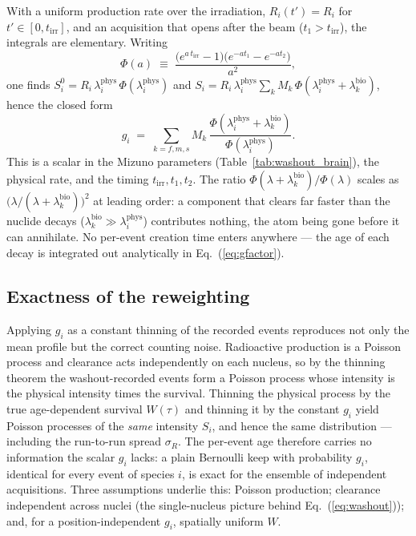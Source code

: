 \documentclass[11pt]{article}
\begin{document}
With a uniform production rate over the irradiation, $R_i(t')=R_i$ for
$t'\in[0,t_{\mathrm{irr}}]$, and an acquisition that opens after the beam
($t_1>t_{\mathrm{irr}}$), the integrals are elementary. Writing
%
\begin{equation}
  \Phi(a) \;\equiv\;
  \frac{\bigl(e^{a\,t_{\mathrm{irr}}}-1\bigr)
        \bigl(e^{-a t_1}-e^{-a t_2}\bigr)}{a^{2}},
  \label{eq:phifun}
\end{equation}
%
one finds $S_i^{0}=R_i\,\lambda_i^{\mathrm{phys}}\,\Phi(\lambda_i^{\mathrm{phys}})$
and $S_i=R_i\,\lambda_i^{\mathrm{phys}}\sum_k M_k\,
\Phi(\lambda_i^{\mathrm{phys}}+\lambda_k^{\mathrm{bio}})$, hence the closed form
%
\begin{equation}
  g_i \;=\; \sum_{k=f,m,s} M_k\,
  \frac{\Phi\!\left(\lambda_i^{\mathrm{phys}}+\lambda_k^{\mathrm{bio}}\right)}
       {\Phi\!\left(\lambda_i^{\mathrm{phys}}\right)} .
  \label{eq:gfactor}
\end{equation}
%
This is a scalar in the Mizuno parameters (Table~\ref{tab:washout_brain}), the
physical rate, and the timing $t_{\mathrm{irr}},t_1,t_2$. The ratio
$\Phi(\lambda+\lambda_k^{\mathrm{bio}})/\Phi(\lambda)$ scales as
$\bigl(\lambda/(\lambda+\lambda_k^{\mathrm{bio}})\bigr)^{2}$ at leading order:
a component that clears far faster than the nuclide decays
($\lambda_k^{\mathrm{bio}}\gg\lambda_i^{\mathrm{phys}}$) contributes nothing,
the atom being gone before it can annihilate. No per-event creation time enters
anywhere --- the age of each decay is integrated out analytically in
Eq.~(\ref{eq:gfactor}).

\subsection*{Exactness of the reweighting}

Applying $g_i$ as a constant thinning of the recorded events reproduces not
only the mean profile but the correct counting noise. Radioactive production is
a Poisson process and clearance acts independently on each nucleus, so by the
thinning theorem the washout-recorded events form a Poisson process whose
intensity is the physical intensity times the survival. Thinning the physical
process by the true age-dependent survival $W(\tau)$ and thinning it by the
constant $g_i$ yield Poisson processes of the \emph{same} intensity $S_i$, and
hence the same distribution --- including the run-to-run spread $\sigma_R$. The
per-event age therefore carries no information the scalar $g_i$ lacks: a plain
Bernoulli keep with probability $g_i$, identical for every event of species
$i$, is exact for the ensemble of independent acquisitions. Three assumptions
underlie this: Poisson production; clearance independent across nuclei (the
single-nucleus picture behind Eq.~(\ref{eq:washout})); and, for a
position-independent $g_i$, spatially uniform $W$.
\end{document}
